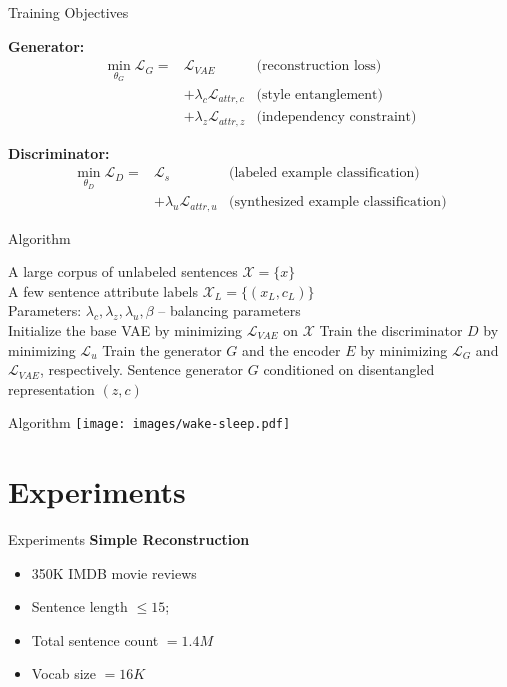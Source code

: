 \documentclass{beamer}
\begin{document}
\begin{frame}{Training Objectives}

	\textbf{Generator:}
	\begin{eqnarray*}
		\operatorname*{min}_{\theta_G} \mathcal{L}_G =
		& \mathcal{L}_{VAE} & \text{(reconstruction loss)} \\
		& + \lambda_c \mathcal{L}_{attr,c} & \text{(style entanglement)} \\
		& + \lambda_z \mathcal{L}_{attr,z} & \text{(independency constraint)}
	\end{eqnarray*}

	\textbf{Discriminator:}
	\begin{eqnarray*}
		\operatorname*{min}_{\theta_D} \mathcal{L}_D =
		& \mathcal{L}_{s} & \text{(labeled example classification)} \\
		& + \lambda_u \mathcal{L}_{attr,u} & \text{(synthesized example classification)}
	\end{eqnarray*}
\end{frame}

\begin{frame}{Algorithm}
	\begin{algorithm}[H]
		\centering
		\begin{algorithmic}[1]
			\REQUIRE A large corpus of unlabeled sentences $\mathcal{X}=\{x\}$ \\
			\quad A few sentence attribute labels $\mathcal{X}_L = \{(x_L,c_L)\}$ \\
			\quad Parameters: $\lambda_c, \lambda_z, \lambda_u, \beta$  -- balancing parameters \\
			\STATE Initialize the base VAE by minimizing $\mathcal{L}_{VAE}$ on $\mathcal{X}$
			\REPEAT
			\STATE Train the discriminator $D$ by minimizing $\mathcal{L}_u$
			\STATE Train the generator $G$ and the encoder $E$ by minimizing $\mathcal{L}_G$ and $\mathcal{L}_{VAE}$, respectively.
			\ENSURE Sentence generator $G$ conditioned on disentangled representation $(z,c)$
		\end{algorithmic}
	\end{algorithm}
\end{frame}

\begin{frame}{Algorithm}
	\centering
	\texttt{[image: images/wake-sleep.pdf]}
\end{frame}

\section{Experiments}
\begin{frame}{Experiments}
	\textbf{Simple Reconstruction}
	\begin{itemize}
		\item 350K IMDB movie reviews
		\item Sentence length $\leq 15$;
		\item Total sentence count $= 1.4M$
		\item Vocab size $= 16K$
	\end{itemize}
\end{frame}
\end{document}
